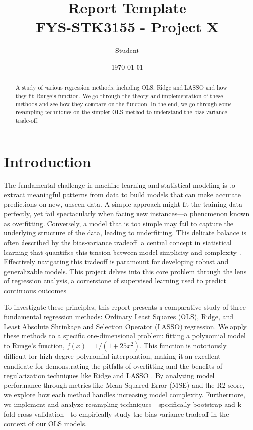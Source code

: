\documentclass[amssymb,twocolumn,aps]{revtex4}
\begin{document}
	
\title{Report Template \\
    \normalsize FYS-STK3155 - Project X}
\date{\today}               
\author{Student}

\newpage
	
\begin{abstract}

A study of various regression methods, including OLS, Ridge and LASSO and how they fit Runge's function. We go through the theory and implementation of these methods and see how they compare on the function. In the end, we go through some resampling techniques on the simpler OLS-method to understand the bias-variance trade-off.
\end{abstract}

\maketitle

\section{Introduction}

The fundamental challenge in machine learning and statistical modeling is to extract meaningful patterns from data to build models that can make accurate predictions on new, unseen data. A simple approach might fit the training data perfectly, yet fail spectacularly when facing new instances—a phenomenon known as overfitting. Conversely, a model that is too simple may fail to capture the underlying structure of the data, leading to underfitting. This delicate balance is often described by the bias-variance tradeoff, a central concept in statistical learning that quantifies this tension between model simplicity and complexity \cite{hastie}. Effectively navigating this tradeoff is paramount for developing robust and generalizable models. This project delves into this core problem through the lens of regression analysis, a cornerstone of supervised learning used to predict continuous outcomes \cite{compfys}.

To investigate these principles, this report presents a comparative study of three fundamental regression methods: Ordinary Least Squares (OLS), Ridge, and Least Absolute Shrinkage and Selection Operator (LASSO) regression. We apply these methods to a specific one-dimensional problem: fitting a polynomial model to Runge's function, $f(x)=1/(1+25x^2)$. This function is notoriously difficult for high-degree polynomial interpolation, making it an excellent candidate for demonstrating the pitfalls of overfitting and the benefits of regularization techniques like Ridge and LASSO \cite{hein}. By analyzing model performance through metrics like Mean Squared Error (MSE) and the R2 score, we explore how each method handles increasing model complexity. Furthermore, we implement and analyze resampling techniques—specifically bootstrap and k-fold cross-validation—to empirically study the bias-variance tradeoff in the context of our OLS models.
\end{document}

